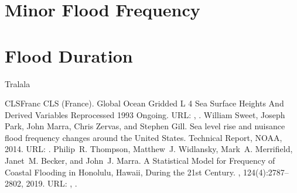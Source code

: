 \documentclass[letterpaper,10pt,english]{jupyterBook}
\begin{document}
\sphinxstepscope


\section{Minor Flood Frequency}
\label{\detokenize{notebooks/FloodFrequency_intra-annual:minor-flood-frequency}}\label{\detokenize{notebooks/FloodFrequency_intra-annual::doc}}
\sphinxstepscope


\section{Flood Duration}
\label{\detokenize{notebooks/FloodDuration_intra-annual:flood-duration}}\label{\detokenize{notebooks/FloodDuration_intra-annual::doc}}
\sphinxAtStartPar
Tralala

\begin{sphinxthebibliography}{CLSFranc}
\sphinxAtStartPar
CLS (France). Global Ocean Gridded L 4 Sea Surface Heights And Derived Variables Reprocessed 1993 Ongoing. URL: , .
\sphinxAtStartPar
William Sweet, Joseph Park, John Marra, Chris Zervas, and Stephen Gill. Sea level rise and nuisance flood frequency changes around the United States. Technical Report, NOAA, 2014. URL: .
\sphinxAtStartPar
Philip R. Thompson, Matthew J. Widlansky, Mark A. Merrifield, Janet M. Becker, and John J. Marra. A Statistical Model for Frequency of Coastal Flooding in Honolulu, Hawaii, During the 21st Century. , 124(4):2787–2802, 2019. URL: , .
\end{sphinxthebibliography}







\renewcommand{\indexname}{Index}
\printindex
\end{document}
